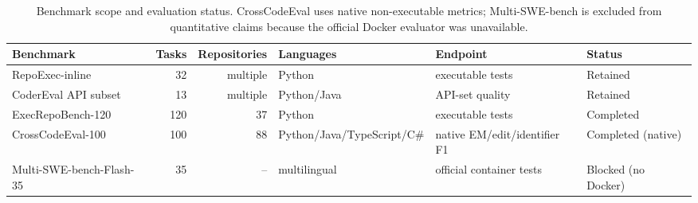 \begin{table}[t]
\centering
\small
\caption{Benchmark scope and evaluation status. CrossCodeEval uses native non-executable metrics; Multi-SWE-bench is excluded from quantitative claims because the official Docker evaluator was unavailable.}
\label{tab:benchmark_characteristics}
\begin{adjustbox}{max width=\textwidth}
\begin{tabular}{lrrlll}
\toprule
Benchmark & Tasks & Repositories & Languages & Endpoint & Status \\
\midrule
RepoExec-inline & 32 & multiple & Python & executable tests & Retained \\
CoderEval API subset & 13 & multiple & Python/Java & API-set quality & Retained \\
ExecRepoBench-120 & 120 & 37 & Python & executable tests & Completed \\
CrossCodeEval-100 & 100 & 88 & Python/Java/TypeScript/C\# & native EM/edit/identifier F1 & Completed (native) \\
Multi-SWE-bench-Flash-35 & 35 & -- & multilingual & official container tests & Blocked (no Docker) \\
\bottomrule
\end{tabular}
\end{adjustbox}
\end{table}

